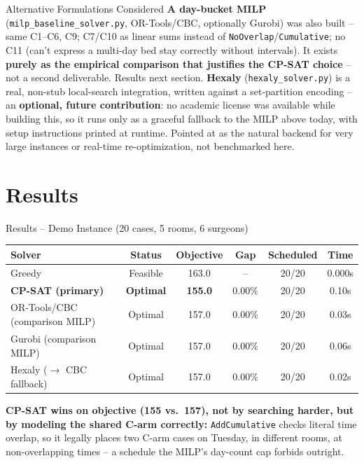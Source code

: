 \documentclass[aspectratio=169]{beamer}
\begin{document}
\begin{frame}{Alternative Formulations Considered}
  \footnotesize
  \textbf{A day-bucket MILP} (\texttt{milp\_baseline\_solver.py}, OR-Tools/CBC,
  optionally Gurobi) was also built -- same C1--C6, C9; C7/C10 as linear sums instead of
  \texttt{NoOverlap}/\texttt{Cumulative}; no C11 (can't express a multi-day bed stay
  correctly without intervals). It exists \textbf{purely as the empirical comparison
  that justifies the CP-SAT choice} -- not a second deliverable. Results next section.
  \vfill
  \textbf{Hexaly} (\texttt{hexaly\_solver.py}) is a real, non-stub local-search
  integration, written against a set-partition encoding -- an \textbf{optional, future
  contribution}: no academic license was available while building this, so it runs
  only as a graceful fallback to the MILP above today, with setup instructions printed
  at runtime. Pointed at as the natural backend for very large instances or real-time
  re-optimization, not benchmarked here.
\end{frame}

\section{Results}

\begin{frame}{Results -- Demo Instance (20 cases, 5 rooms, 6 surgeons)}
  \footnotesize
  \begin{table}
    \centering
    \begin{tabular}{lccccc}
      \toprule
      Solver & Status & Objective & Gap & Scheduled & Time \\
      \midrule
      Greedy & Feasible & 163.0 & -- & 20/20 & 0.000s \\
      \textbf{CP-SAT (primary)} & \textbf{Optimal} & \textbf{155.0} & 0.00\% & 20/20 & 0.10s \\
      OR-Tools/CBC (comparison MILP) & Optimal & 157.0 & 0.00\% & 20/20 & 0.03s \\
      Gurobi (comparison MILP) & Optimal & 157.0 & 0.00\% & 20/20 & 0.06s \\
      Hexaly ($\to$ CBC fallback) & Optimal & 157.0 & 0.00\% & 20/20 & 0.02s \\
      \bottomrule
    \end{tabular}
  \end{table}
  \vfill
  \normalsize\textbf{CP-SAT wins on objective (155 vs.\ 157), not by searching harder,
  but by modeling the shared C-arm correctly:} \texttt{AddCumulative} checks literal
  time overlap, so it legally places two C-arm cases on Tuesday, in different rooms,
  at non-overlapping times -- a schedule the MILP's day-count cap forbids outright.
\end{frame}
\end{document}
